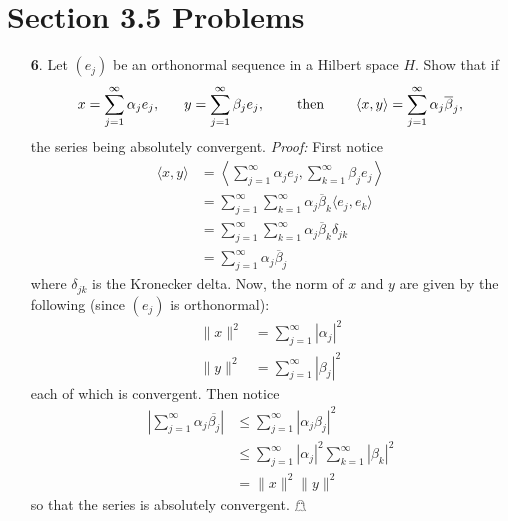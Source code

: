 \documentclass{article}
\begin{document}
\section*{Section 3.5 Problems}
\begin{itemize}
    \item[\textbf{6}.] Let $(e_j)$ be an orthonormal sequence in a Hilbert space $H$. Show that if
    \[x = \sum_{j = 1}^{\infty} \alpha_je_j, \hspace{0.6cm} y = \sum_{j = 1}^{\infty} \beta_je_j, \hspace{0.8cm} \text{then} \hspace{0.8cm} \langle x, y \rangle = \sum_{j = 1}^{\infty} \alpha_j\overline{\beta}_j,\]
    the series being absolutely convergent.
    \newline\newline
    \textit{Proof:} First notice
    \begin{align*}
        \langle x, y \rangle &= \left\langle \sum_{j = 1}^{\infty} \alpha_je_j, \sum_{k = 1}^{\infty}\beta_je_j \right\rangle\\
        &= \sum_{j=1}^{\infty}\sum_{k = 1}^{\infty} \alpha_j\overline{\beta}_k \langle e_j, e_k \rangle\\
        &= \sum_{j=1}^{\infty}\sum_{k=1}^{\infty}\alpha_j\overline{\beta}_k \delta_{jk}\\
        &= \sum_{j = 1}^{\infty} \alpha_j\overline{\beta}_j
    \end{align*}
    where $\delta_{jk}$ is the Kronecker delta. Now, the norm of $x$ and $y$ are given by the following (since $(e_j)$ is orthonormal):
    \begin{align*}
        \|x\|^2 &= \sum_{j = 1}^{\infty} |\alpha_j|^2\\
        \|y\|^2 &= \sum_{j = 1}^{\infty} |\beta_j|^2
    \end{align*}
    each of which is convergent. Then notice
    \begin{align*}
        \left|\sum_{j=1}^{\infty}\alpha_j\overline{\beta_j}\right| &\leq \sum_{j = 1}^{\infty} |\alpha_j\beta_j|^2\\
        &\leq \sum_{j=1}^{\infty}|\alpha_j|^2\sum_{k=1}^{\infty}|\beta_k|^2\\
        &= \|x\|^2\|y\|^2
    \end{align*}
    so that the series is absolutely convergent. \hfill $\mathghost$



\end{itemize}
\end{document}
